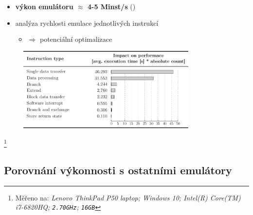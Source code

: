 \documentclass[compress]{beamer}
\begin{document}
\begin{frame}
	\begin{itemize}
		\item \textbf{výkon emulátoru $\approx$ 4-5 Minst/s} (\href{https://github.com/MartinUbl/KIV-RTOS}{})
		\item analýza rychlosti emulace jednotlivých instrukcí
		\begin{itemize}
			\item $\Rightarrow$ potenciální optimalizace
		\end{itemize}
	\end{itemize}
	\begin{figure}
		\centering
		\includegraphics[width=0.8\textwidth]{img/performance_2.pdf}
	\end{figure}
	\footnote{\tiny Měřeno na: \textit{Lenovo ThinkPad P50 laptop; Windows 10; \newline Intel(R) Core(TM) i7-6820HQ; \texttt{2.70GHz}; \texttt{16GB}} \vspace{0.5cm}}
\end{frame}

\subsection{Porovnání výkonnosti s ostatními emulátory}
\end{document}
